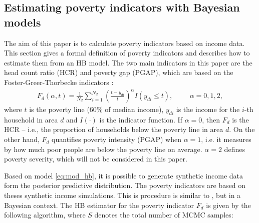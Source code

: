 \subsection{Estimating poverty indicators with Bayesian models}
\label{ch:indicators}

The aim of this paper is to calculate poverty indicators based on income data.
This section gives a formal definition of poverty indicators and describes how to estimate them from an HB model.
The two main indicators in this paper are the head count ratio (HCR) and poverty gap (PGAP), which
are based on the Foster-Greer-Thorbecke indicators \citep{foster_class_1984}:
\begin{gather*}
    F_d(\alpha, t) = \displaystyle \frac 1 {N_d} \sum_{i=1}^{N_d}\left( \frac{t - y_{di}}{t} \right)^\alpha I (y_{di} \le t),
    \hspace{1cm}\alpha = 0, 1, 2,
\end{gather*}
where $t$ is the poverty line (60\% of median income), $y_{di}$ is the income for the $i$-th household in area $d$ and $I(\cdot)$ is the indicator function.
If $\alpha = 0$, then $F_d$ is the HCR – i.e., the proportion of households below the poverty line in area $d$.
On the other hand, $F_d$ quantifies poverty intensity (PGAP) when $\alpha = 1$, i.e. it measures by how much poor people are below the poverty line on average.
$\alpha = 2$ defines poverty severity, which will not be considered in this paper.

Based on model \ref{eq:mod_hb}, it is possible to generate synthetic income data form the posterior predictive distribution.
The poverty indicators are based on theses synthetic income simulations.
This is procedure is similar to \cite{rojas_perilla_data_2020}, but in a Bayesian context.
The HB estimator for the poverty indicator $F_d$ is given by the following algorithm, where $S$ denotes the total number of MCMC samples:

\newpage

